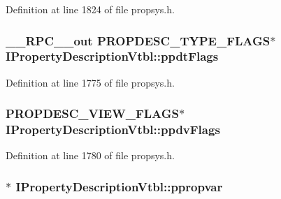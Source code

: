 Definition at line 1824 of file propsys.\+h.

\subsubsection[{\texorpdfstring{ppdt\+Flags}{ppdtFlags}}]{ {\bf \+\_\+\+\_\+\+R\+P\+C\+\_\+\+\_\+out} {\bf P\+R\+O\+P\+D\+E\+S\+C\+\_\+\+T\+Y\+P\+E\+\_\+\+F\+L\+A\+GS}$\ast$ I\+Property\+Description\+Vtbl\+::ppdt\+Flags}\hypertarget{struct_i_property_description_vtbl_a9cc234972d4f2a3d3c175801bd1ed505}{}\label{struct_i_property_description_vtbl_a9cc234972d4f2a3d3c175801bd1ed505}


Definition at line 1775 of file propsys.\+h.

\subsubsection[{\texorpdfstring{ppdv\+Flags}{ppdvFlags}}]{ {\bf P\+R\+O\+P\+D\+E\+S\+C\+\_\+\+V\+I\+E\+W\+\_\+\+F\+L\+A\+GS}$\ast$ I\+Property\+Description\+Vtbl\+::ppdv\+Flags}\hypertarget{struct_i_property_description_vtbl_a88431a6dd3ac61852d5f75da72762c3b}{}\label{struct_i_property_description_vtbl_a88431a6dd3ac61852d5f75da72762c3b}


Definition at line 1780 of file propsys.\+h.

\subsubsection[{\texorpdfstring{ppropvar}{ppropvar}}]{$\ast$ I\+Property\+Description\+Vtbl\+::ppropvar}\hypertarget{struct_i_property_description_vtbl_a4e4eaf6023039b546b8a2099e0d5449d}{}\label{struct_i_property_description_vtbl_a4e4eaf6023039b546b8a2099e0d5449d}


